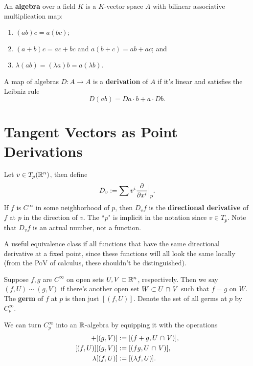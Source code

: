 \documentclass[twoside,10pt]{report}
\begin{document}
\begin{defn}[]
	An \textbf{algebra} over a field $K$ is a $K$-vector space $A$ with bilinear associative multiplication map:
	\begin{enumerate}
		\item $(ab)c = a(bc)$;
		\item $(a+b)c = ac+bc$ and $a(b+c) = ab+ac$; and
		\item $\lambda(ab) = (\lambda a)b = a(\lambda b)$.
	\end{enumerate}
\end{defn}

\begin{defn}[]
A map of algebras $D:A\to A$ is a \textbf{derivation} of $A$ if it's linear and satisfies the Leibniz rule
\[
	D(ab) = Da\cdot b + a \cdot Db.
\] 
\end{defn}

\section{Tangent Vectors as Point Derivations}

\begin{defn}[]
	Let $v \in T_{p}(\mathbb{R}^{n})$, then define
	\[
	D_{v} := \sum v^{i} \frac{\partial }{\partial x^{i}} \Big|_{p}.
	\] 
	If $f$ is $C^{\infty}$ in some neighborhood of $p$, then $D_{v}f$ is the \textbf{directional derivative} of $f$ at $p$ in the direction of $v$. The ``$p$" is implicit in the notation since $v \in T_{p}$. Note that $D_{v}f$ is an actual number, not a function.
\end{defn}

A useful equivalence class if all functions that have the same directional derivative at a fixed point, since these functions will all look the same locally (from the PoV of calculus, these shouldn't be distinguished).

\begin{defn}[]
	Suppose $f,g$ are $C^{\infty}$ on open sets $U,V \subset \mathbb{R}^{n}$, respectively. Then we say $(f,U) \sim (g,V)$ if there's another open set $W \subset U \operatorname{\,\cap\,} V$ such that $f=g$ on $W$. The \textbf{germ} of $f$ at $p$ is then just $[(f,U)]$. Denote the set of all germs at $p$ by $C_{p}^{\infty}$.
\end{defn}

We can turn $C_{p}^{\infty}$ into an $\mathbb{R}$-algebra by equipping it with the operations
\begin{align*}
	[(f,U)] + [(g,V)] &:= [(f+g,U\isct V)],\\
	[(f,U)] [(g,V)] &:= [(fg,U\isct V)],\\
	\lambda [(f,U)] &:= [(\lambda f,U)].
\end{align*}
\end{document}
